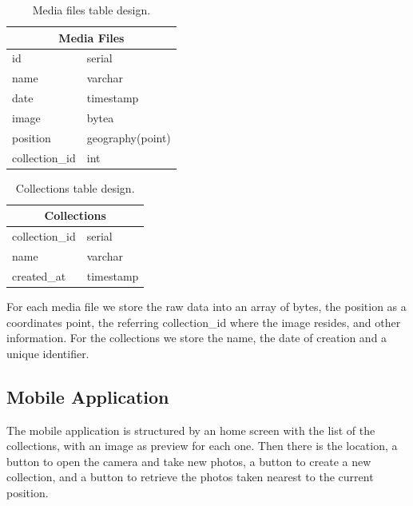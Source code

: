 \documentclass[conference]{IEEEtran}
\begin{document}
\begin{table}[h!]
\centering
\begin{tabular}{llll}
\multicolumn{4}{c}{Media Files}                                            \\ \hline
\multicolumn{2}{l|}{id}             & \multicolumn{2}{l}{serial}           \\
\multicolumn{2}{l|}{name}           & \multicolumn{2}{l}{varchar}          \\
\multicolumn{2}{l|}{date}           & \multicolumn{2}{l}{timestamp}        \\
\multicolumn{2}{l|}{image}          & \multicolumn{2}{l}{bytea}            \\
\multicolumn{2}{l|}{position}       & \multicolumn{2}{l}{geography(point)} \\
\multicolumn{2}{l|}{collection\_id} & \multicolumn{2}{l}{int}             
\end{tabular}
\caption{Media files table design.}
\label{table:mf}
\end{table}

\begin{table}[h!]
\centering
\begin{tabular}{llll}
\multicolumn{4}{c}{Collections}                                     \\ \hline
\multicolumn{2}{l|}{collection\_id} & \multicolumn{2}{l}{serial}    \\
\multicolumn{2}{l|}{name}           & \multicolumn{2}{l}{varchar}   \\
\multicolumn{2}{l|}{created\_at}    & \multicolumn{2}{l}{timestamp}
\end{tabular}
\caption{Collections table design.}
\label{table:col}
\end{table}

For each media file we store the raw data into an array of bytes, the position as a coordinates point, the referring collection\_id where the image resides, and other information.
For the collections we store the name, the date of creation and a unique identifier.    

\subsection{Mobile Application}
The mobile application is structured by an home screen with the list of the collections, with an image as preview for each one. Then there is the location, a button to open the camera and take new photos, a button to create a new collection, and a button to retrieve the photos taken nearest to the current position. 
\end{document}
